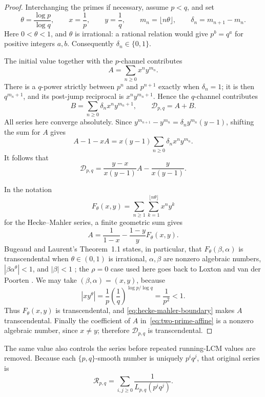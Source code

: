 \documentclass[11pt]{article}
\begin{document}
\begin{proof}
Interchanging the primes if necessary, assume $p<q$, and set
\[
 \theta=\frac{\log p}{\log q},\qquad x=\frac1p,\qquad y=\frac1q,\qquad
 m_n=\lfloor n\theta\rfloor,\qquad
 \delta_n=m_{n+1}-m_n .
\]
Here $0<\theta<1$, and $\theta$ is irrational: a rational relation would give
$p^b=q^a$ for positive integers $a,b$.  Consequently
$\delta_n\in\{0,1\}$.

The initial value together with the $p$-channel contributes
\[
 A=\sum_{n\ge0}x^ny^{m_n}.
\]
There is a $q$-power strictly between $p^n$ and $p^{n+1}$ exactly when
$\delta_n=1$; it is then $q^{m_n+1}$, and its post-jump reciprocal is
$x^ny^{m_n+1}$.  Hence the $q$-channel contributes
\[
 B=\sum_{n\ge0}\delta_nx^ny^{m_n+1},
 \qquad \mathcal D_{p,q}=A+B.
\]
All series here converge absolutely.  Since
$y^{m_{n+1}}-y^{m_n}=\delta_n y^{m_n}(y-1)$, shifting the sum for $A$ gives
\[
 A-1-xA
 =x(y-1)\sum_{n\ge0}\delta_nx^ny^{m_n}.
\]
It follows that
\begin{equation}\label{eq:two-prime-affine}
 \mathcal D_{p,q}
 =\frac{y-x}{x(y-1)}A-\frac{y}{x(y-1)}.
\end{equation}

In the notation
\[
 F_\theta(x,y)
 =\sum_{n\ge1}\sum_{k=1}^{\lfloor n\theta\rfloor}x^ny^k
\]
for the Hecke--Mahler series, a finite geometric sum gives
\begin{equation}\label{eq:hecke-mahler-boundary}
 A=\frac1{1-x}-\frac{1-y}{y}F_\theta(x,y).
\end{equation}
Bugeaud and Laurent's Theorem~1.1 states, in particular, that
$F_\theta(\beta,\alpha)$ is transcendental when $\theta\in(0,1)$ is
irrational, $\alpha,\beta$ are nonzero algebraic numbers,
$|\beta\alpha^\theta|<1$, and $|\beta|<1$
\cite[p.~61, Theorem~1.1]{bugeaudlaurent2023}; the $\rho=0$ case used here
goes back to Loxton and van der Poorten
\cite[Theorem~8]{loxtonvdp1977}.  We may take
$(\beta,\alpha)=(x,y)$, because
\[
 |xy^\theta|=\frac1p\left(\frac1q\right)^{\log p/\log q}
 =\frac1{p^2}<1.
\]
Thus $F_\theta(x,y)$ is transcendental, and
\eqref{eq:hecke-mahler-boundary} makes $A$ transcendental.  Finally the
coefficient of $A$ in~\eqref{eq:two-prime-affine} is a nonzero algebraic
number, since $x\ne y$; therefore $\mathcal D_{p,q}$ is transcendental.
\end{proof}

The same value also controls the series before repeated running-LCM values are
removed.  Because each $\{p,q\}$-smooth number is uniquely $p^iq^j$, that
original series is
\[
 \mathcal R_{p,q}
 =\sum_{i,j\ge0}\frac1{L_{p,q}(p^iq^j)}.
\]
\end{document}
